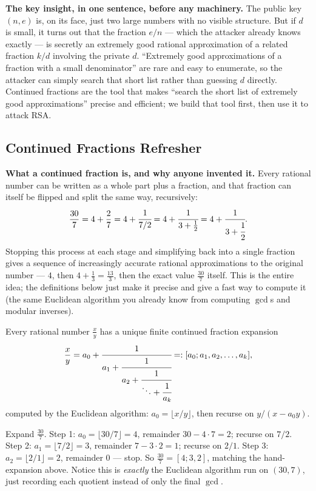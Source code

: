 \medskip\noindent\textbf{The key insight, in one sentence, before any machinery.} The public key $(n,e)$ is, on its face, just two large numbers with no visible structure. But if $d$ is small, it turns out that the fraction $e/n$ — which the attacker already knows exactly — is secretly an extremely good rational approximation of a related fraction $k/d$ involving the private $d$. ``Extremely good approximations of a fraction with a small denominator'' are rare and easy to enumerate, so the attacker can simply search that short list rather than guessing $d$ directly. Continued fractions are the tool that makes ``search the short list of extremely good approximations'' precise and efficient; we build that tool first, then use it to attack RSA.

\subsection{Continued Fractions Refresher}

\medskip\noindent\textbf{What a continued fraction is, and why anyone invented it.} Every rational number can be written as a whole part plus a fraction, and that fraction can itself be flipped and split the same way, recursively:
\[
\frac{30}{7} = 4 + \frac{2}{7} = 4 + \cfrac{1}{7/2} = 4 + \cfrac{1}{3 + \tfrac12} = 4 + \cfrac{1}{3 + \cfrac{1}{2}}.
\]
Stopping this process at each stage and simplifying back into a single fraction gives a sequence of increasingly accurate rational approximations to the original number — $4$, then $4+\frac13 = \frac{13}{3}$, then the exact value $\frac{30}{7}$ itself. This is the entire idea; the definitions below just make it precise and give a fast way to compute it (the same Euclidean algorithm you already know from computing $\gcd$s and modular inverses).

\begin{definition}
Every rational number $\frac{x}{y}$ has a unique finite continued fraction expansion
\[
\frac{x}{y} = a_0 + \cfrac{1}{a_1 + \cfrac{1}{a_2 + \cfrac{1}{\ddots + \cfrac{1}{a_k}}}} =: [a_0; a_1, a_2, \dots, a_k],
\]
computed by the Euclidean algorithm: $a_0 = \lfloor x/y \rfloor$, then recurse on $y / (x - a_0 y)$.
\end{definition}

\begin{example}
Expand $\frac{30}{7}$. Step 1: $a_0 = \lfloor 30/7\rfloor = 4$, remainder $30 - 4\cdot7 = 2$; recurse on $7/2$. Step 2: $a_1 = \lfloor 7/2 \rfloor = 3$, remainder $7-3\cdot2=1$; recurse on $2/1$. Step 3: $a_2 = \lfloor 2/1 \rfloor = 2$, remainder $0$ — stop. So $\frac{30}{7} = [4;3,2]$, matching the hand-expansion above. Notice this is \emph{exactly} the Euclidean algorithm run on $(30,7)$, just recording each quotient instead of only the final $\gcd$.
\end{example}

